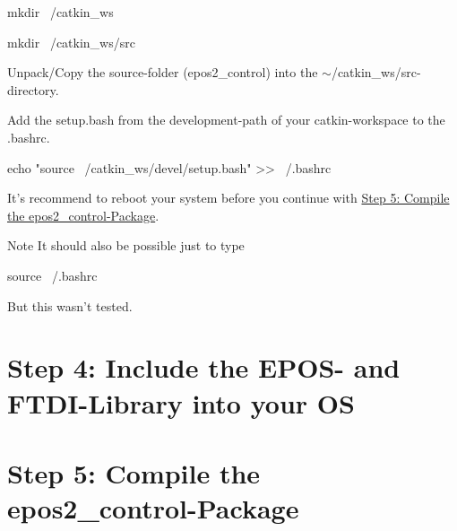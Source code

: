 \begin{DoxyVerb}mkdir ~/catkin_ws

mkdir ~/catkin_ws/src
\end{DoxyVerb}


Unpack/\-Copy the source-\/folder (epos2\-\_\-control) into the $\sim$/catkin\-\_\-ws/src-\/directory.

Add the setup.\-bash from the development-\/path of your catkin-\/workspace to the .bashrc.

\begin{DoxyVerb}echo "source ~/catkin_ws/devel/setup.bash" >> ~/.bashrc
\end{DoxyVerb}


It's recommend to reboot your system before you continue with \hyperlink{setup_setup_step5}{Step 5\-: Compile the epos2\-\_\-control-\/\-Package}.

\begin{DoxyNote}{Note}
It should also be possible just to type \begin{DoxyVerb}source ~/.bashrc \end{DoxyVerb}
 But this wasn't tested.
\end{DoxyNote}
\hypertarget{setup_setup_step4}{}\section{Step 4\-: Include the E\-P\-O\-S-\/ and F\-T\-D\-I-\/\-Library into your O\-S}\label{setup_setup_step4}
\hypertarget{setup_setup_step5}{}\section{Step 5\-: Compile the epos2\-\_\-control-\/\-Package}\label{setup_setup_step5}
